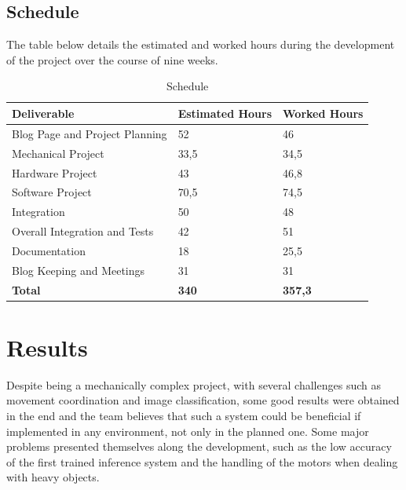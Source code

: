 \documentclass[a4paper,11pt]{article}
\begin{document}
\subsection{Schedule}
The table below details the estimated and worked hours during the development of the project over the course of nine weeks.

\begin{table}[H]
  \small
  \caption{\small{Schedule}}
  \begin{center}
    \begin{tabular}{|l|l|l|}
      \hline
      \textbf{Deliverable}           & \textbf{Estimated Hours} & \textbf{Worked Hours} \\ \hline
      Blog Page and Project Planning & 52                       & 46                    \\ \hline
      Mechanical Project             & 33,5                     & 34,5                  \\ \hline
      Hardware Project               & 43                       & 46,8                  \\ \hline
      Software Project               & 70,5                     & 74,5                  \\ \hline
      Integration                    & 50                       & 48                    \\ \hline
      Overall Integration and Tests  & 42                       & 51                    \\ \hline
      Documentation                  & 18                       & 25,5                  \\ \hline
      Blog Keeping and Meetings      & 31                       & 31                    \\ \hline
      \textbf{Total}                 & \textbf{340}             & \textbf{357,3}        \\ \hline
    \end{tabular}
  \end{center}
  \label{tab:schedule}
\end{table}

\section{Results}
Despite being a mechanically complex project, with several challenges such as movement coordination and image classification, some good results were obtained in the end and the team believes that such a system could be beneficial if implemented in any environment, not only in the planned one. Some major problems presented themselves along the development, such as the low accuracy of the first trained inference system and the handling of the motors when dealing with heavy objects.
\end{document}
